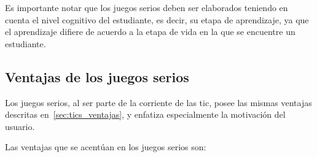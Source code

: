 Es importante notar que los juegos serios deben ser elaborados teniendo en cuenta el
nivel cognitivo del estudiante, es decir, su etapa de aprendizaje, ya que el
aprendizaje difiere de acuerdo a la etapa de vida en la que se encuentre un
estudiante\cite{education:games}.

\subsection{Ventajas de los juegos serios}

Los juegos serios, al ser parte de la corriente de las \Gls{tic}, posee las
mismas ventajas descritas en~\ref{sec:tics_ventajas}, y enfatiza especialmente
la motivación del usuario.

Las ventajas que se acentúan en los juegos serios son:

